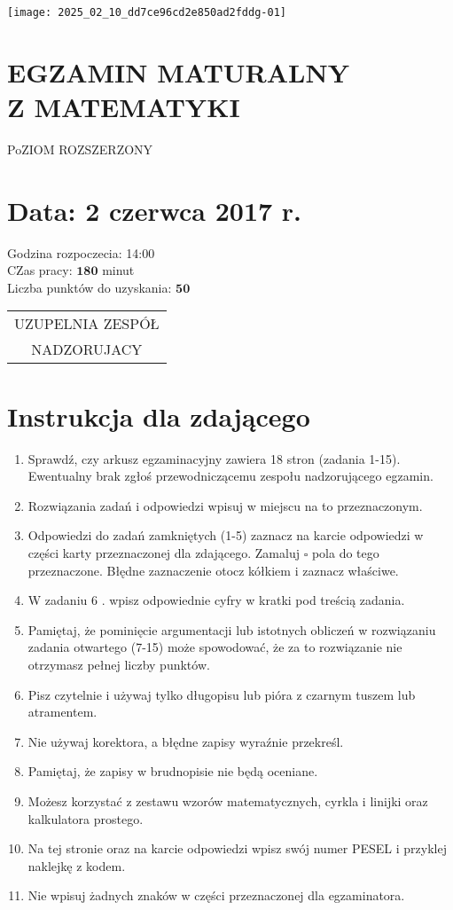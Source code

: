 \documentclass[10pt]{article}
\begin{document}
\begin{center}
\texttt{[image: 2025\_02\_10\_dd7ce96cd2e850ad2fddg-01]}
\end{center}

\section*{EGZAMIN MATURALNY \\
 Z MATEMATYKI}
PoZIOM ROZSZERZONY

\section*{Data: \(\mathbf{2}\) czerwca 2017 r.}
Godzina rozpoczecia: 14:00\\
CZas pracy: \(\mathbf{1 8 0}\) minut\\
Liczba punktów do uzyskania: \(\mathbf{5 0}\)

\begin{center}
\begin{tabular}{|c|}
\hline
UZUPELNIA ZESPÓŁ \\
NADZORUJACY \\
\end{tabular}
\end{center}

\section*{Instrukcja dla zdającego}
\begin{enumerate}
  \item Sprawdź, czy arkusz egzaminacyjny zawiera 18 stron (zadania 1-15). Ewentualny brak zgłoś przewodniczącemu zespołu nadzorującego egzamin.
  \item Rozwiązania zadań i odpowiedzi wpisuj w miejscu na to przeznaczonym.
  \item Odpowiedzi do zadań zamkniętych (1-5) zaznacz na karcie odpowiedzi w części karty przeznaczonej dla zdającego. Zamaluj \(\square\) pola do tego przeznaczone. Błędne zaznaczenie otocz kółkiem i zaznacz właściwe.
  \item W zadaniu 6 . wpisz odpowiednie cyfry w kratki pod treścią zadania.
  \item Pamiętaj, że pominięcie argumentacji lub istotnych obliczeń w rozwiązaniu zadania otwartego (7-15) może spowodować, że za to rozwiązanie nie otrzymasz pełnej liczby punktów.
  \item Pisz czytelnie i używaj tylko długopisu lub pióra z czarnym tuszem lub atramentem.
  \item Nie używaj korektora, a błędne zapisy wyraźnie przekreśl.
  \item Pamiętaj, że zapisy w brudnopisie nie będą oceniane.
  \item Możesz korzystać z zestawu wzorów matematycznych, cyrkla i linijki oraz kalkulatora prostego.
  \item Na tej stronie oraz na karcie odpowiedzi wpisz swój numer PESEL i przyklej naklejkę z kodem.
  \item Nie wpisuj żadnych znaków w części przeznaczonej dla egzaminatora.
\end{enumerate}
\end{document}
